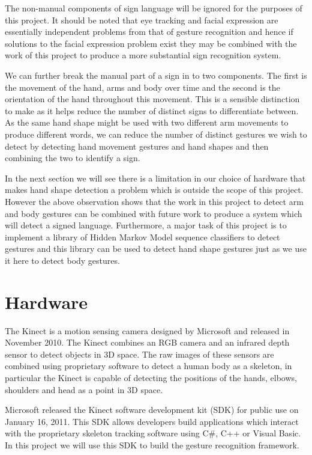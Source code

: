 The non-manual components of sign language will be ignored for the purposes of this project. It should be noted that eye tracking and facial expression are essentially independent problems from that of gesture recognition and hence if solutions to the facial expression problem exist they may be combined with the work of this project to produce a more substantial sign recognition system.

We can further break the manual part of a sign in to two components. The first is the movement of the hand, arms and body over time and the second is the orientation of the hand throughout this movement. This is a sensible distinction to make as it helps reduce the number of distinct signs to differentiate between. As the same hand shape might be used with two different arm movements to produce different words, we can reduce the number of distinct gestures we wish to detect by detecting hand movement gestures and hand shapes and then combining the two to identify a sign.

In the next section we will see there is a limitation in our choice of hardware that makes hand shape detection a problem which is outside the scope of this project. However the above observation shows that the work in this project to detect arm and body gestures can be combined with future work to produce a system which will detect a signed language. Furthermore, a major task of this project is to implement a library of Hidden Markov Model sequence classifiers to detect gestures and this library can be used to detect hand shape gestures just as we use it here to detect body gestures. 

\section{Hardware}
The Kinect is a motion sensing camera designed by Microsoft and released in November 2010. The Kinect combines an RGB camera and an infrared depth sensor to detect objects in 3D space. The raw images of these sensors are combined using proprietary software to detect a human body as a skeleton, in particular the Kinect is capable of detecting the positions of the hands, elbows, shoulders and head as a point in 3D space.

Microsoft released the Kinect software development kit (SDK) for public use on January 16, 2011. This SDK allows developers build applications which interact with the proprietary skeleton tracking software using C\#, C++ or Visual Basic. In this project we will use this SDK to build the gesture recognition framework.

